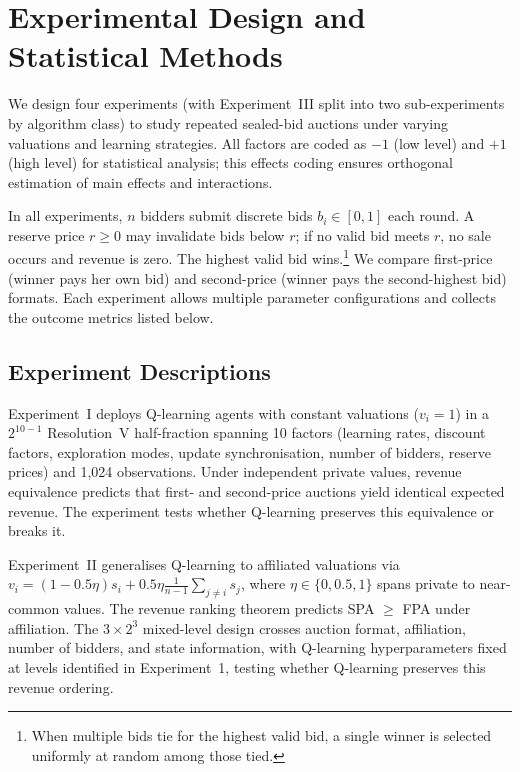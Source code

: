 \section{Experimental Design and Statistical Methods}
\label{sec:experiments}

We design four experiments (with Experiment~III split into two sub-experiments by algorithm class) to study repeated sealed-bid auctions under varying valuations and learning strategies. All factors are coded as $-1$ (low level) and $+1$ (high level) for statistical analysis; this effects coding ensures orthogonal estimation of main effects and interactions.

In all experiments, $n$ bidders submit discrete bids $b_i\in[0,1]$ each round. A reserve price $r\ge 0$ may invalidate bids below $r$; if no valid bid meets $r$, no sale occurs and revenue is zero. The highest valid bid wins.\footnote{When multiple bids tie for the highest valid bid, a single winner is selected uniformly at random among those tied.} We compare first-price (winner pays her own bid) and second-price (winner pays the second-highest bid) formats. Each experiment allows multiple parameter configurations and collects the outcome metrics listed below.

\subsection{Experiment Descriptions}

Experiment~I deploys Q-learning agents with constant valuations ($v_i = 1$) in a $2^{10-1}$ Resolution~V half-fraction spanning 10 factors (learning rates, discount factors, exploration modes, update synchronisation, number of bidders, reserve prices) and 1{,}024 observations. Under independent private values, revenue equivalence \citep{Vickrey1961} predicts that first- and second-price auctions yield identical expected revenue. The experiment tests whether Q-learning preserves this equivalence or breaks it.

Experiment~II generalises Q-learning to affiliated valuations via $v_i = (1 - 0.5\eta)s_i + 0.5\eta \frac{1}{n-1}\sum_{j \neq i} s_j$, where $\eta \in \{0, 0.5, 1\}$ spans private to near-common values. The revenue ranking theorem \citep{MilgromWeber1982} predicts SPA $\geq$ FPA under affiliation. The $3 \times 2^3$ mixed-level design crosses auction format, affiliation, number of bidders, and state information, with Q-learning hyperparameters fixed at levels identified in Experiment~1, testing whether Q-learning preserves this revenue ordering.

